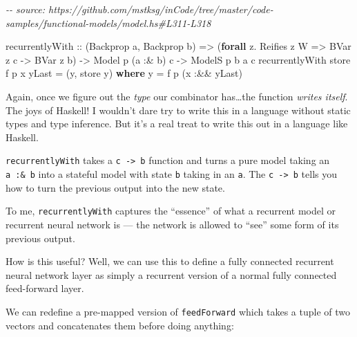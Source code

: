 \documentclass[]{article}
\newenvironment{Shaded}{}{}
\newcommand{\CommentTok}[1]{\textcolor[rgb]{0.38,0.63,0.69}{\textit{#1}}}
\newcommand{\DataTypeTok}[1]{\textcolor[rgb]{0.56,0.13,0.00}{#1}}
\newcommand{\KeywordTok}[1]{\textcolor[rgb]{0.00,0.44,0.13}{\textbf{#1}}}
\newcommand{\NormalTok}[1]{#1}
\newcommand{\OperatorTok}[1]{\textcolor[rgb]{0.40,0.40,0.40}{#1}}
\newcommand{\OtherTok}[1]{\textcolor[rgb]{0.00,0.44,0.13}{#1}}
\begin{document}
\begin{Shaded}
\begin{Highlighting}[]
\CommentTok{{-}{-} source: https://github.com/mstksg/inCode/tree/master/code{-}samples/functional{-}models/model.hs\#L311{-}L318}

\NormalTok{recurrentlyWith}
\OtherTok{    ::}\NormalTok{ (}\DataTypeTok{Backprop}\NormalTok{ a, }\DataTypeTok{Backprop}\NormalTok{ b)}
    \OtherTok{=\textgreater{}}\NormalTok{ (}\KeywordTok{forall}\NormalTok{ z}\OperatorTok{.} \DataTypeTok{Reifies}\NormalTok{ z }\DataTypeTok{W} \OtherTok{=\textgreater{}} \DataTypeTok{BVar}\NormalTok{ z c }\OtherTok{{-}\textgreater{}} \DataTypeTok{BVar}\NormalTok{ z b)}
    \OtherTok{{-}\textgreater{}} \DataTypeTok{Model}\NormalTok{  p   (a }\OperatorTok{:\&}\NormalTok{ b) c}
    \OtherTok{{-}\textgreater{}} \DataTypeTok{ModelS}\NormalTok{ p b  a       c}
\NormalTok{recurrentlyWith store f p x yLast }\OtherTok{=}\NormalTok{ (y, store y)}
  \KeywordTok{where}
\NormalTok{    y }\OtherTok{=}\NormalTok{ f p (x }\OperatorTok{:\&\&}\NormalTok{ yLast)}
\end{Highlighting}
\end{Shaded}

Again, once we figure out the \emph{type} our combinator has\ldots the function
\emph{writes itself}. The joys of Haskell! I wouldn't dare try to write this in
a language without static types and type inference. But it's a real treat to
write this out in a language like Haskell.

\texttt{recurrentlyWith} takes a \texttt{c\ -\textgreater{}\ b} function and
turns a pure model taking an \texttt{a\ :\&\ b} into a stateful model with state
\texttt{b} taking in an \texttt{a}. The \texttt{c\ -\textgreater{}\ b} tells you
how to turn the previous output into the new state.

To me, \texttt{recurrentlyWith} captures the ``essence'' of what a recurrent
model or recurrent neural network is --- the network is allowed to ``see'' some
form of its previous output.

How is this useful? Well, we can use this to define a fully connected recurrent
neural network layer as simply a recurrent version of a normal fully connected
feed-forward layer.

We can redefine a pre-mapped version of \texttt{feedForward} which takes a tuple
of two vectors and concatenates them before doing anything:
\end{document}
